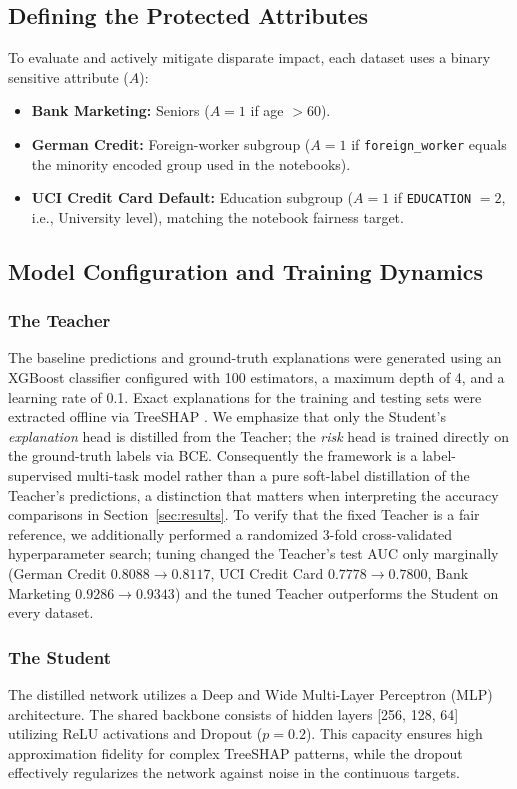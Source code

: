 \documentclass{wscpaperproc}
\theoremstyle{wsc}
\begin{document}
\subsection{Defining the Protected Attributes}
To evaluate and actively mitigate disparate impact, each dataset uses a binary sensitive attribute ($A$):
\begin{itemize}
    \item \textbf{Bank Marketing:} Seniors ($A=1$ if age $>60$).
    \item \textbf{German Credit:} Foreign-worker subgroup ($A=1$ if \texttt{foreign\_worker} equals the minority encoded group used in the notebooks).
    \item \textbf{UCI Credit Card Default:} Education subgroup ($A=1$ if \texttt{EDUCATION} $=2$, i.e., University level), matching the notebook fairness target.
\end{itemize}

\subsection{Model Configuration and Training Dynamics}
\subsubsection{The Teacher} 
The baseline predictions and ground-truth explanations were generated using an XGBoost classifier configured with 100 estimators, a maximum depth of 4, and a learning rate of 0.1. Exact explanations for the training and testing sets were extracted offline via TreeSHAP \cite{NIPS2017_8a20a862}. We emphasize that only the Student's \emph{explanation} head is distilled from the Teacher; the \emph{risk} head is trained directly on the ground-truth labels via BCE. Consequently the framework is a label-supervised multi-task model rather than a pure soft-label distillation of the Teacher's predictions, a distinction that matters when interpreting the accuracy comparisons in Section~\ref{sec:results}. To verify that the fixed Teacher is a fair reference, we additionally performed a randomized 3-fold cross-validated hyperparameter search; tuning changed the Teacher's test AUC only marginally (German Credit $0.8088\!\to\!0.8117$, UCI Credit Card $0.7778\!\to\!0.7800$, Bank Marketing $0.9286\!\to\!0.9343$) and the tuned Teacher outperforms the Student on every dataset.

\subsubsection{The Student} 
The distilled network utilizes a Deep and Wide Multi-Layer Perceptron (MLP) architecture. The shared backbone consists of hidden layers [256, 128, 64] utilizing ReLU activations and Dropout ($p=0.2$). This capacity ensures high approximation fidelity for complex TreeSHAP patterns, while the dropout effectively regularizes the network against noise in the continuous targets.
\end{document}
